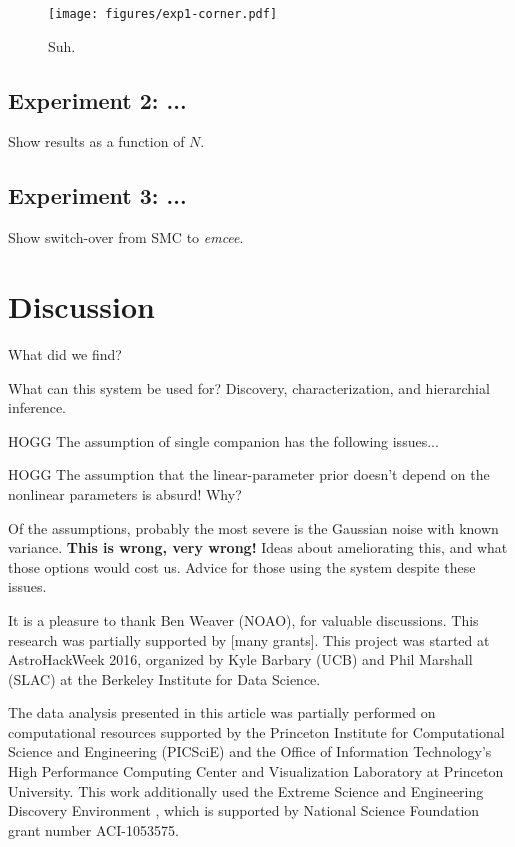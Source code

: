 \documentclass[12pt, preprint]{aastex6}
\newcommand{\project}[1]{\textsl{#1}}
\newcommand{\emcee}{\project{emcee}}
\begin{document}
\begin{figure}[p]
\begin{center}
\texttt{[image: figures/exp1-corner.pdf]}
\end{center}
\caption{%
Suh.
\label{fig:exp1-corner}}
\end{figure}

\subsection{Experiment 2: ...}

Show results as a function of $N$.

\subsection{Experiment 3: ...}

Show switch-over from SMC to \emcee.

\section{Discussion}

What did we find?

What can this system be used for? Discovery, characterization, and
hierarchial inference.

HOGG The assumption of single companion has the following issues...

HOGG The assumption that the linear-parameter prior doesn't depend
on the nonlinear parameters is absurd! Why?

Of the assumptions, probably the most severe is the Gaussian noise
with known variance. \textbf{This is wrong, very wrong!} Ideas about
ameliorating this, and what those options would cost us. Advice for
those using the system despite these issues.

\acknowledgements
It is a pleasure to thank
  Ben Weaver (NOAO),
for valuable discussions.
This research was partially supported by [many grants].
This project was started at AstroHackWeek 2016, organized by Kyle
Barbary (UCB) and Phil Marshall (SLAC) at the Berkeley Institute for
Data Science.

The data analysis presented in this article was partially performed on
computational resources supported by the Princeton Institute for Computational
Science and Engineering (PICSciE) and the Office of Information Technology's
High Performance Computing Center and Visualization Laboratory at Princeton
University.
This work additionally used the Extreme Science and Engineering Discovery
Environment \citep[XSEDE;][]{Towns:2014}, which is supported by National
Science Foundation grant number ACI-1053575.
\end{document}
